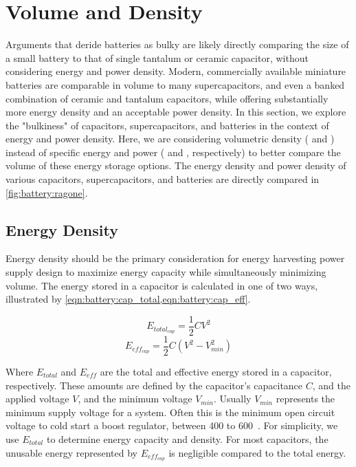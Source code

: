 \section{Volume and Density}
\label{sec:battery:density}
Arguments that deride batteries as bulky are likely directly comparing the size of a small battery to that of single tantalum or ceramic capacitor, without considering energy and power density. Modern, commercially available miniature batteries are comparable in volume to many supercapacitors, and even a banked combination of ceramic and tantalum capacitors, while offering substantially more energy density and an acceptable power density. In this section, we explore the "bulkiness" of capacitors, supercapacitors, and batteries in the context of energy and power density. Here, we are considering volumetric density (\ssi[per-mode=symbol]{\Wh\per\liter}  and  \ssi[per-mode=symbol]{\watt\per\liter}) instead of specific energy and power (\ssi[per-mode=symbol]{\Wh\per\kilo\gram} and  \ssi[per-mode=symbol]{\watt\per\kilo\gram}, respectively) to better compare the volume of these energy storage options. The energy density and power density of various capacitors, supercapacitors, and batteries are directly compared in \cref{fig:battery:ragone}.


\subsection{Energy Density}
Energy density should be the primary consideration for energy harvesting power supply design to maximize energy capacity while simultaneously minimizing volume. 
The energy stored in a capacitor is calculated in one of two ways, illustrated by \cref{eqn:battery:cap_total,eqn:battery:cap_eff}.

\begin{equation}\label{eqn:battery:cap_total}
E_{total_{cap}} = \frac{1}{2} C V^2
\end{equation}
\begin{equation}\label{eqn:battery:cap_eff}
E_{eff_{cap}} = \frac{1}{2} C (V^2 - V_{min}^2)
\end{equation}

\noindent Where $E_{total}$ and $E_{eff}$ are the total and effective energy stored in a capacitor, respectively. These amounts are defined by the capacitor's capacitance $C$, and the applied voltage $V$, and the minimum voltage $V_{min}$. Usually $V_{min}$ represents the minimum supply voltage for a system. 
Often this is the minimum open circuit voltage to cold start a boost regulator, between 400\ssi{\milli\volt} to 600\ssi{\milli\volt}~\cite{adp5091,bq25505,max17222}. 
For simplicity, we use $E_{total}$ to determine energy capacity and density. For most capacitors, the unusable energy represented by $E_{eff_{cap}}$ is negligible compared to the total energy. 

